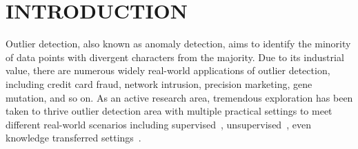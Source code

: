 \documentclass[sigconf,nonacm]{acmart}
\begin{document}




\maketitle

\section{INTRODUCTION}
Outlier detection, also known as anomaly detection, aims to identify the minority of data points with divergent characters from the majority. Due to its industrial value, there are numerous widely real-world applications of outlier detection, including credit card fraud, network intrusion, precision marketing, gene mutation, and so on. As an active research area, tremendous exploration has been taken to thrive outlier detection area with multiple practical settings to meet different real-world scenarios including supervised~\textcolor{gray}{\cite{aggarwal2013outlier,chalapathy2019deep}}, unsupervised~\textcolor{gray}{\cite{Breunig00SIR,gupta2014outlier,agrawal2015survey}}, even knowledge transferred settings~\textcolor{gray}{\cite{yu2019knowledge}}.
\end{document}
